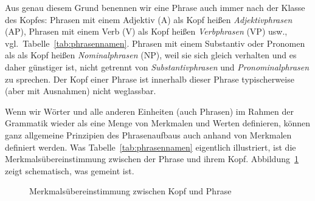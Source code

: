 Aus genau diesem Grund benennen wir eine Phrase auch immer nach der Klasse des Kopfes:
Phrasen mit einem Adjektiv (A) als Kopf heißen \textit{Adjektivphrasen} (AP), Phrasen mit einem Verb (V) als Kopf heißen \textit{Verbphrasen} (VP) usw., vgl.\ Tabelle~\ref{tab:phrasennamen}.
Phrasen mit einem Substantiv oder Pronomen als als Kopf heißen \textit{Nominalphrasen} (NP), weil sie sich gleich verhalten und es daher günstiger ist, nicht getrennt von \textit{Substantivphrasen} und \textit{Pronominalphrasen} zu sprechen. 
Der Kopf einer Phrase ist innerhalb dieser Phrase typischerweise (aber mit Ausnahmen) nicht weglassbar.\label{abs:kopfnichtweglassbar}

\begin{table}
  \caption{Phrasenbezeichnungen nach ihren Köpfen}
  \label{tab:phrasennamen}
\end{table}

Wenn wir Wörter und alle anderen Einheiten (auch Phrasen) im Rahmen der Grammatik wieder als eine Menge von Merkmalen und Werten definieren, können ganz allgemeine Prinzipien des Phrasenaufbaus auch anhand von Merkmalen definiert werden.
Was Tabelle~\ref{tab:phrasennamen} eigentlich illustriert, ist die Merkmalsübereinstimmung zwischen der Phrase und ihrem Kopf.
Abbildung~\ref{fig:hfp} zeigt schematisch, was gemeint ist.

\begin{figure}
  \centering
  \caption{Merkmalsübereinstimmung zwischen Kopf und Phrase}
  \label{fig:hfp}
\end{figure}

